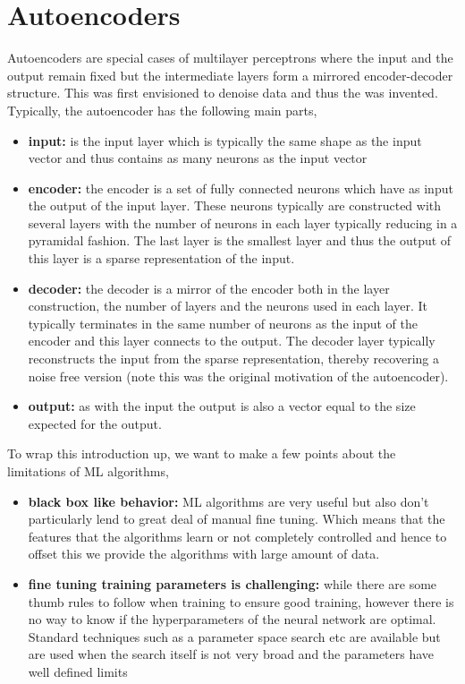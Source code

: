 \section{Autoencoders}
Autoencoders are special cases of multilayer perceptrons where the input and the output remain fixed but the intermediate layers form a mirrored encoder-decoder structure.
This was first envisioned to denoise data and thus the \citep[denoising autoencoder, ][]{vincent2011connection} was invented.
Typically, the autoencoder has the following main parts,
\begin{itemize}
    \item \textbf{input:} is the input layer which is typically the same shape as the input vector and thus contains as many neurons as the input vector
    \item\textbf{encoder:} the encoder is a set of fully connected neurons which have as input the output of the input layer. 
    These neurons typically are constructed with several layers with the number of neurons in each layer typically reducing in a pyramidal fashion.
    The last layer is the smallest layer and thus the output of this layer is a sparse representation of the input.
    \item\textbf{decoder: } the decoder is a mirror of the encoder both in the layer construction, the number of layers and the neurons used in each layer. 
    It typically terminates in the same number of neurons as the input of the encoder and this layer connects to the output.
    The decoder layer typically reconstructs the input from the sparse representation, thereby recovering a noise free version (note this was the original motivation of the autoencoder).
    \item \textbf{output:} as with the input the output is also a vector equal to the size expected for the output.
\end{itemize}

To wrap this introduction up, we want to make a few points about the limitations of ML algorithms,
\begin{itemize}
    \item \textbf{black box like behavior:} ML algorithms are very useful but also don't particularly lend to great deal of manual fine tuning. 
    Which means that the features that the algorithms learn or not completely controlled and hence to offset this we provide the algorithms with large amount of data.
    \item{\textbf{fine tuning training parameters is challenging:} while there are some thumb rules to follow when training to ensure good training, however there is no way to know if the hyperparameters of the neural network are optimal. 
    Standard techniques such as a parameter space search etc are available but are used when the search itself is not very broad and the parameters have well defined limits}
\end{itemize}
